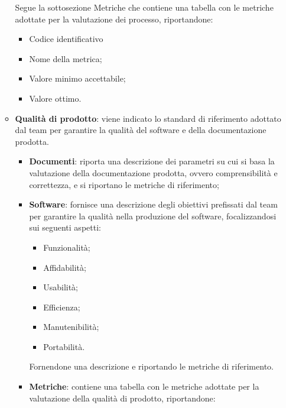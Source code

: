 \begin{itemize}
\begin{itemize}
                        Segue la sottosezione Metriche che contiene una tabella con le metriche
                        adottate per la valutazione dei processo, riportandone:
                        \begin{itemize}
                              \item Codice identificativo
                              \item Nome della metrica;
                              \item Valore minimo accettabile;
                              \item Valore ottimo.
                        \end{itemize}
                  \item \textbf{Qualità di prodotto}: viene indicato lo standard di riferimento adottato dal team per garantire la qualità del software e della documentazione prodotta.
                        \begin{itemize}
                              \item \textbf{Documenti}: riporta una descrizione dei parametri su cui si basa la valutazione della documentazione prodotta, ovvero comprensibilità e correttezza, e si riportano le metriche di riferimento;
                              \item \textbf{Software}: fornisce una descrizione degli obiettivi prefissati dal team per garantire la qualità nella produzione del software, focalizzandosi sui seguenti aspetti:
                                    \begin{itemize}
                                          \item Funzionalità;
                                          \item Affidabilità;
                                          \item Usabilità;
                                          \item Efficienza;
                                          \item Manutenibilità;
                                          \item Portabilità.
                                    \end{itemize}
                                    Fornendone una descrizione e riportando le metriche di riferimento.
                              \item \textbf{Metriche}: contiene una tabella con le metriche adottate per la valutazione della qualità di prodotto, riportandone:

\end{itemize}
\end{itemize}
\end{itemize}
